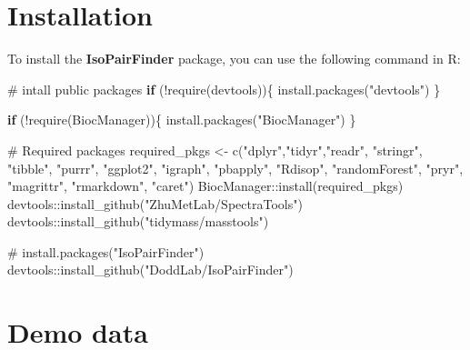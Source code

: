 \documentclass[
  letterpaper,
  DIV=11,
  numbers=noendperiod]{scrreprt}
\newenvironment{Shaded}{\begin{snugshade}}{\end{snugshade}}
\newcommand{\CommentTok}[1]{\textcolor[rgb]{0.37,0.37,0.37}{#1}}
\newcommand{\ControlFlowTok}[1]{\textcolor[rgb]{0.00,0.23,0.31}{\textbf{#1}}}
\newcommand{\FunctionTok}[1]{\textcolor[rgb]{0.28,0.35,0.67}{#1}}
\newcommand{\NormalTok}[1]{\textcolor[rgb]{0.00,0.23,0.31}{#1}}
\newcommand{\OtherTok}[1]{\textcolor[rgb]{0.00,0.23,0.31}{#1}}
\newcommand{\SpecialCharTok}[1]{\textcolor[rgb]{0.37,0.37,0.37}{#1}}
\newcommand{\StringTok}[1]{\textcolor[rgb]{0.13,0.47,0.30}{#1}}
\begin{document}
\section{Installation}\label{installation}

To install the \textbf{IsoPairFinder} package, you can use the following
command in R:

\begin{Shaded}
\begin{Highlighting}[]
\CommentTok{\# intall public packages}
\ControlFlowTok{if}\NormalTok{ (}\SpecialCharTok{!}\FunctionTok{require}\NormalTok{(devtools))\{}
    \FunctionTok{install.packages}\NormalTok{(}\StringTok{"devtools"}\NormalTok{)}
\NormalTok{\}}

\ControlFlowTok{if}\NormalTok{ (}\SpecialCharTok{!}\FunctionTok{require}\NormalTok{(BiocManager))\{}
    \FunctionTok{install.packages}\NormalTok{(}\StringTok{"BiocManager"}\NormalTok{)}
\NormalTok{\}}

\CommentTok{\# Required packages}
\NormalTok{required\_pkgs }\OtherTok{\textless{}{-}} \FunctionTok{c}\NormalTok{(}\StringTok{"dplyr"}\NormalTok{,}\StringTok{"tidyr"}\NormalTok{,}\StringTok{"readr"}\NormalTok{, }\StringTok{"stringr"}\NormalTok{, }\StringTok{"tibble"}\NormalTok{, }\StringTok{"purrr"}\NormalTok{,}
\StringTok{"ggplot2"}\NormalTok{, }\StringTok{"igraph"}\NormalTok{, }\StringTok{"pbapply"}\NormalTok{, }\StringTok{"Rdisop"}\NormalTok{, }\StringTok{"randomForest"}\NormalTok{, }\StringTok{"pryr"}\NormalTok{, }\StringTok{"magrittr"}\NormalTok{, }\StringTok{"rmarkdown"}\NormalTok{, }\StringTok{"caret"}\NormalTok{)}
\NormalTok{BiocManager}\SpecialCharTok{::}\FunctionTok{install}\NormalTok{(required\_pkgs)}
\NormalTok{devtools}\SpecialCharTok{::}\FunctionTok{install\_github}\NormalTok{(}\StringTok{"ZhuMetLab/SpectraTools"}\NormalTok{)}
\NormalTok{devtools}\SpecialCharTok{::}\FunctionTok{install\_github}\NormalTok{(}\StringTok{"tidymass/masstools"}\NormalTok{)}

\CommentTok{\# install.packages("IsoPairFinder")}
\NormalTok{devtools}\SpecialCharTok{::}\FunctionTok{install\_github}\NormalTok{(}\StringTok{"DoddLab/IsoPairFinder"}\NormalTok{)}
\end{Highlighting}
\end{Shaded}

\section{Demo data}\label{demo-data}
\end{document}
